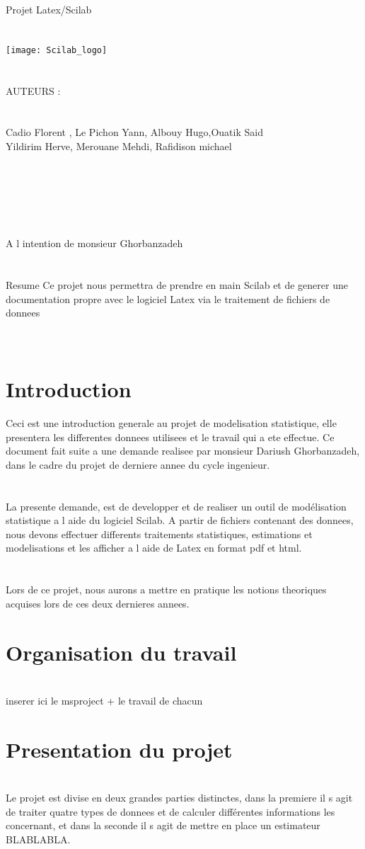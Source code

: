 \documentclass[a4paper,12pt,reqno]{article}
\newcommand{\newparagraphe}[1]{\paragraph{#1}\mbox{}\\}
\begin{document}
\begin{center}
{ \huge Projet Latex/Scilab} 
\newparagraphe{}
\texttt{[image: Scilab\_logo]}
\newparagraphe{}
AUTEURS :
\newparagraphe{}
 Cadio Florent , Le Pichon Yann, Albouy Hugo,Ouatik Said\\ Yildirim Herve, Merouane Mehdi, Rafidison michael 
\newparagraphe{}
\newparagraphe{}
\newparagraphe{}
{ A l intention de monsieur Ghorbanzadeh} 
\end{center}
\newparagraphe{}
Resume Ce projet nous permettra de prendre en main Scilab et de generer une documentation propre avec le logiciel Latex via le traitement de fichiers de donnees
\pagebreak 
\tableofcontents 
\cleardoublepage
\pagestyle{plain}
\newparagraphe{}
\section{Introduction}
Ceci est une introduction generale au projet de modelisation statistique, elle presentera les differentes donnees utilisees et le travail qui a ete effectue. Ce document fait suite a une demande realisee par monsieur Dariush Ghorbanzadeh, dans le cadre du projet de derniere annee du cycle ingenieur. 
\newparagraphe{}
La presente demande, est de developper et de realiser un outil de modélisation statistique a l aide du logiciel Scilab. A partir de fichiers contenant des donnees, nous devons effectuer differents traitements statistiques,  estimations et modelisations et les afficher a l aide de Latex en format pdf et html.
\newparagraphe{}
Lors de ce projet, nous aurons a mettre en pratique  les notions theoriques acquises lors de ces deux dernieres annees.
\pagebreak 

\section{Organisation du travail}
\newparagraphe{}

inserer ici le msproject + le travail de chacun
\pagebreak 

\section{Presentation du projet}
\newparagraphe{}

Le projet est divise en deux grandes parties distinctes, dans la premiere il s agit de traiter quatre types de donnees et de calculer différentes informations les concernant, et dans la seconde il s agit de mettre en place un estimateur BLABLABLA.
\end{document}
